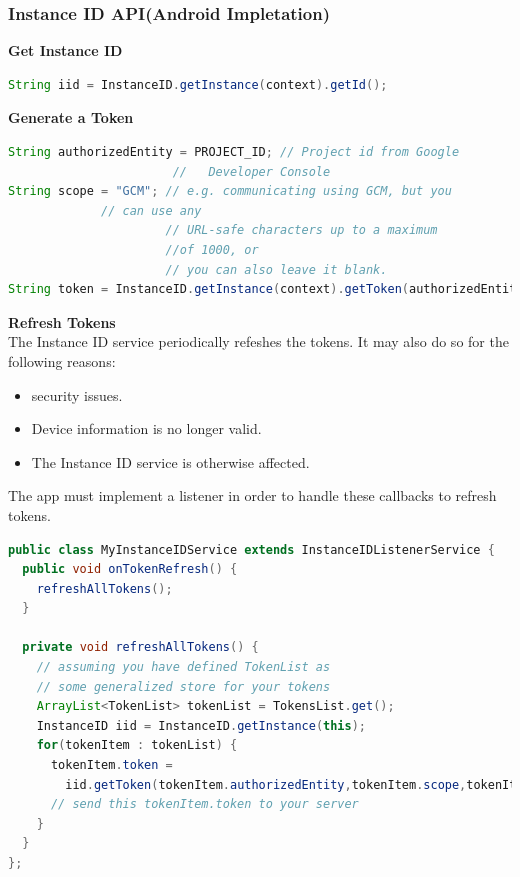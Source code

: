  \subsubsection{Instance ID API(Android Impletation)} 
 \textbf{Get Instance ID}
\begin{lstlisting}[language=java]
String iid = InstanceID.getInstance(context).getId();
\end{lstlisting}
\textbf{Generate a Token}
\begin{lstlisting}[language=java]
String authorizedEntity = PROJECT_ID; // Project id from Google 
					   //	Developer Console
String scope = "GCM"; // e.g. communicating using GCM, but you 
			 //	can use any
                      // URL-safe characters up to a maximum 
                      //of 1000, or
                      // you can also leave it blank.
String token = InstanceID.getInstance(context).getToken(authorizedEntity,scope);
\end{lstlisting}
\textbf{Refresh Tokens}\\
The Instance ID service periodically refeshes the tokens. It may also do so for the following reasons:
\begin{itemize}
\item security issues.
\item Device information is no longer valid.
\item The Instance ID service is otherwise affected.
\end{itemize}
The app must implement a listener in order to handle these callbacks to refresh tokens.
\begin{lstlisting}[language=java]
public class MyInstanceIDService extends InstanceIDListenerService {
  public void onTokenRefresh() {
    refreshAllTokens();
  }

  private void refreshAllTokens() {
    // assuming you have defined TokenList as
    // some generalized store for your tokens
    ArrayList<TokenList> tokenList = TokensList.get();
    InstanceID iid = InstanceID.getInstance(this);
    for(tokenItem : tokenList) {
      tokenItem.token =
        iid.getToken(tokenItem.authorizedEntity,tokenItem.scope,tokenItem.options);
      // send this tokenItem.token to your server
    }
  }
};
\end{lstlisting}
